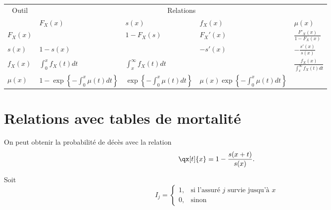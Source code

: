 \begin{center}
	\begin{tabular}{@{}l|llll@{}}
		\toprule
		\multicolumn{1}{c}{Outil} &                                                                                                                \multicolumn{4}{c}{Relations}                                                                                                                 \\
		\cmidrule(r){1-1}\cmidrule(r){2-5} & $F_{X}(x)$                                                    & $s(x)$                                                    & $f_{X}(x)$                                                       & $\mu(x)$                                                      \\ \midrule
		$F_{X}(x)$ &                                                               & $\displaystyle 1 - F_{X}(s)$                              & $\displaystyle F_{X}'(x)$                                        & $\displaystyle \frac{F'_{X}(x)}{1 - F_{X}(x)}$                \\
		$s(x)$ & $\displaystyle 1 - s(x)$                                      &                                                           & $\displaystyle -s'(x)$                                           & $\displaystyle -\frac{s'(x)}{s(x)}$                           \\
		$f_{X}(x)$ & $\displaystyle \int_{0}^{x} f_{X}(t) dt$                      & $\displaystyle \int_{x}^{\infty}f_{X}(t) dt$              &                                                                  & $\displaystyle \frac{f_{X}(x)}{\int_{x}^{\infty}f_{X}(t) dt}$ \\
		$\mu(x)$ & $\displaystyle 1 - \exp\left\{-\int_{0}^{x}\mu(t) dt\right\}$ & $\displaystyle \exp\left\{-\int_{0}^{x}\mu(t) dt\right\}$ & $\displaystyle \mu(x) \exp\left\{-\int_{0}^{x}\mu(t) dt\right\}$ &                                                               \\ \bottomrule
	\end{tabular}
\end{center}

\section{Relations avec tables de mortalité}

On peut obtenir la probabilité de décès avec la relation $$\qx[t]{x} = 1 - \frac{s(x + t)}{s(x)}.$$

Soit $$I_j = \begin{cases}
1, & \text{si l'assuré $j$ survie jusqu'à $x$}\\
0, & \text{sinon}
\end{cases}$$

